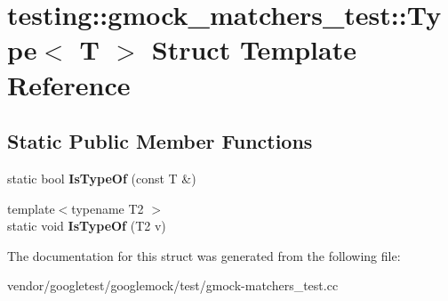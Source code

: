 \hypertarget{structtesting_1_1gmock__matchers__test_1_1_type}{}\section{testing\+:\+:gmock\+\_\+matchers\+\_\+test\+:\+:Type$<$ T $>$ Struct Template Reference}
\label{structtesting_1_1gmock__matchers__test_1_1_type}
\subsection*{Static Public Member Functions}
\begin{DoxyCompactItemize}
\item 
\mbox{\label{structtesting_1_1gmock__matchers__test_1_1_type_ad0b8d166a185471db49aa9009520d74f}} 
static bool {\bfseries Is\+Type\+Of} (const T \&)
\item 
\mbox{\label{structtesting_1_1gmock__matchers__test_1_1_type_a5451b10be4ff47bd2dc3741eb70dde59}} 
{\footnotesize template$<$typename T2 $>$ }\\static void {\bfseries Is\+Type\+Of} (T2 v)
\end{DoxyCompactItemize}


The documentation for this struct was generated from the following file\+:\begin{DoxyCompactItemize}
\item 
vendor/googletest/googlemock/test/gmock-\/matchers\+\_\+test.\+cc\end{DoxyCompactItemize}
